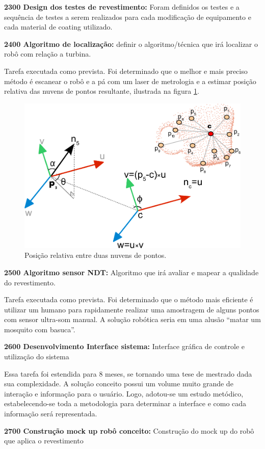 \noindent
\textbf{2300 Design dos testes de revestimento:} Foram definidos os testes e a
sequência de testes a serem realizados para cada modificação de equipamento e
cada material de coating utilizado.

\noindent
\textbf{2400 Algoritmo de localização:} definir o algoritmo/técnica que irá
localizar o robô com relação a turbina.

Tarefa executada como prevista. Foi determinado que o melhor e mais preciso
método é escanear o robô e a pá com um laser de metrologia e a estimar posição
relativa das nuvens de pontos resultante, ilustrada na figura
\ref{fig::pos_rel}.

\begin{figure}[H]
\centering
\includegraphics[width=0.6\columnwidth]{figs/pc_position}
\caption{Posição relativa entre duas nuvens de pontos.}
\label{fig::pos_rel}
\end{figure} 

\noindent
\textbf{2500 Algoritmo sensor NDT:} Algoritmo que irá avaliar e mapear a
qualidade do revestimento.

Tarefa executada como prevista. Foi determinado que o método mais eficiente é
utilizar um humano para rapidamente realizar uma amostragem de alguns pontos com
sensor ultra-som manual. A solução robótica seria em uma alusão “matar um mosquito com basuca”.

\noindent
\textbf{2600 Desenvolvimento Interface sistema:} Interface gráfica de controle e
utilização do sistema

Essa tarefa foi estendida para 8 meses, se tornando uma tese de mestrado dada
sua complexidade. A solução conceito possui um volume muito grande de interação
e informação para o usuário. Logo, adotou-se um estudo metódico,
estabelecendo-se toda a metodologia para determinar a interface e como cada
informação será representada.

\noindent
\textbf{2700 Construção mock up robô conceito:} Construção do mock up do robô
que aplica o revestimento

